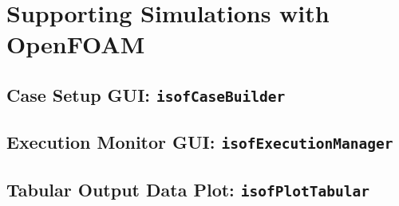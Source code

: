 \section{Supporting Simulations with OpenFOAM}

\subsection{Case Setup GUI: \texttt{isofCaseBuilder}}

\subsection{Execution Monitor GUI: \texttt{isofExecutionManager}}

\subsection{Tabular Output Data Plot: \texttt{isofPlotTabular}}